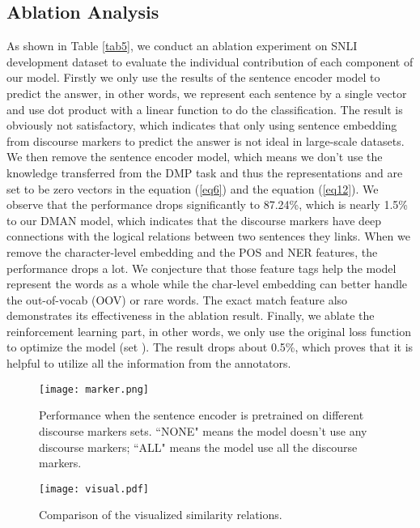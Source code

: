 \documentclass[11pt,letterpaper]{article}
\begin{document}
\subsection{Ablation Analysis}
As shown in Table \ref{tab5}, we conduct an ablation experiment on SNLI development dataset to evaluate the individual contribution of each component of our model. Firstly we only use the results of the sentence encoder model to predict the answer, in other words, we represent each sentence by a single vector and use dot product with a linear function to do the classification. The result is obviously not satisfactory, which indicates that only using sentence embedding from discourse markers to predict the answer is not ideal in large-scale datasets. We then remove the sentence encoder model, which means we don't use the knowledge transferred from the DMP task and thus the representations  and  are set to be zero vectors in the equation (\ref{eq6}) and the equation (\ref{eq12}). We observe that the performance drops significantly to 87.24\%, which is nearly 1.5\% to our DMAN model, which indicates that the discourse markers have deep connections with the logical relations between two sentences they links. When we remove the character-level embedding and the POS and NER features, the performance drops a lot. We conjecture that those feature tags help the model represent the words as a whole while the char-level embedding can better handle the out-of-vocab (OOV) or rare words. The exact match feature also demonstrates its effectiveness in the ablation result. Finally, we ablate the reinforcement learning part, in other words, we only use the original loss function to optimize the model (set ). The result drops about 0.5\%, which proves that it is helpful to utilize all the information from the annotators.

\begin{figure}[t]
	\texttt{[image: marker.png]}
	\caption{\label{fig2} Performance when the sentence encoder is pretrained on different discourse markers sets. ``NONE" means the model doesn't use any discourse markers; ``ALL" means the model use all the discourse markers.}
\end{figure}





\begin{figure}[t]
	\texttt{[image: visual.pdf]}
	\caption{\label{fig3} Comparison of the visualized similarity relations.}
\end{figure}
\end{document}
